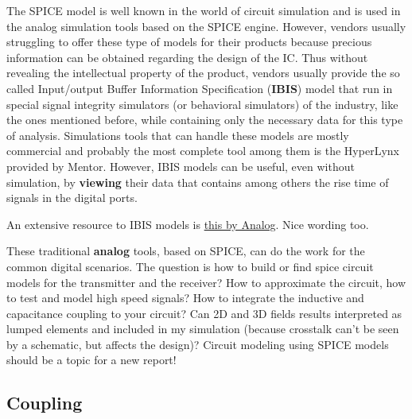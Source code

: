 \documentclass[12pt]{article}
\begin{document}
The SPICE model is well known in the world of circuit simulation and is used in the analog simulation tools based on the SPICE engine. However, vendors usually struggling to offer these type of models for their products because precious information can be obtained regarding the design of the IC. Thus without revealing the intellectual property of the product, vendors usually provide the so called Input/output Buffer Information Specification (\textbf{IBIS}) model that run in special signal integrity simulators (or behavioral simulators) of the industry, like the ones mentioned before, while containing only the necessary data for this type of analysis. Simulations tools that can handle these models are mostly commercial and probably the most complete tool among them is the HyperLynx provided by Mentor.
However, IBIS models can be useful, even without simulation, by \textbf{viewing} their data that contains among others the rise time of signals in the digital ports.

An extensive resource to IBIS models is \href{https://www.analog.com/media/en/technical-documentation/application-notes/AN-715.pdf}{this by Analog}. Nice wording too.


These traditional \textbf{analog} tools, based on SPICE, can do the work for the common digital scenarios. The question is how to build or find spice circuit models for the transmitter and the receiver? How to approximate the circuit, how to test and model high speed signals? How to integrate the inductive and capacitance coupling to your circuit? Can 2D and 3D fields results interpreted as lumped elements and included in my simulation (because crosstalk can't be seen by a schematic, but affects the design)? Circuit modeling using SPICE models should be a topic for a new report!


\subsection{Coupling}
\end{document}
